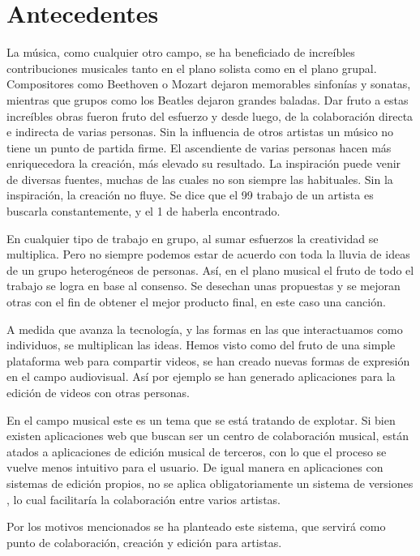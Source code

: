 \section{Antecedentes}

La música, como cualquier otro campo, se ha beneficiado de increíbles
contribuciones musicales tanto en el plano solista como en el plano grupal.
Compositores como Beethoven o Mozart dejaron memorables sinfonías y sonatas,
mientras que grupos como los Beatles dejaron grandes baladas. Dar fruto a estas
increíbles obras fueron fruto del esfuerzo y desde luego, de la colaboración
directa e indirecta de varias personas. Sin la influencia de otros artistas un
músico no tiene un punto de partida firme. El ascendiente de varias personas
hacen más enriquecedora la creación,  más elevado su resultado.  La inspiración
puede venir de diversas fuentes, muchas de las cuales no son siempre las
habituales. Sin la inspiración, la creación no fluye. Se dice que el 99%
trabajo de un artista es buscarla constantemente, y el 1%
de haberla encontrado.

En cualquier tipo de trabajo en grupo, al sumar esfuerzos la creatividad se
multiplica. Pero no siempre podemos estar de acuerdo con toda la lluvia de
ideas de un grupo heterogéneos de personas. Así, en el plano musical el fruto
de todo el trabajo se logra en base al consenso. Se desechan unas propuestas y
se mejoran otras con el fin de obtener el mejor producto final, en este caso
una canción.

A medida que avanza la tecnología, y las formas en las que interactuamos como
individuos, se multiplican las ideas. Hemos visto como del fruto de una simple
plataforma web para compartir videos, se han creado nuevas formas de expresión
en el campo audiovisual. Así por ejemplo se han generado aplicaciones para la
edición de videos con otras personas.

En el campo musical este es un tema que se está tratando de explotar. Si bien
existen aplicaciones web que buscan ser un centro de colaboración musical,
están atados a aplicaciones de edición musical de terceros, con lo que el
proceso se vuelve menos intuitivo para el usuario. De igual manera en
aplicaciones con sistemas de edición propios, no se aplica obligatoriamente un
sistema de versiones , lo cual facilitaría la colaboración entre varios
artistas.

Por los motivos mencionados se ha planteado este sistema, que servirá como
punto de colaboración, creación y edición para artistas.

